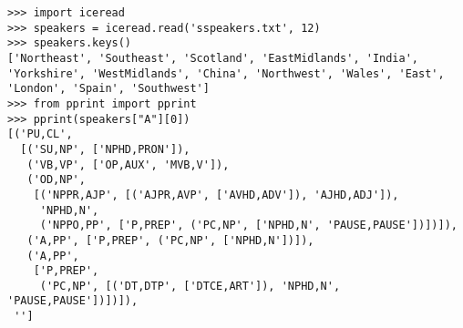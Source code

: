 \documentclass{beamer}
\begin{document}
\begin{frame}
\begin{verbatim}
>>> import iceread
>>> speakers = iceread.read('sspeakers.txt', 12)
>>> speakers.keys()
['Northeast', 'Southeast', 'Scotland', 'EastMidlands', 'India', 'Yorkshire', 'WestMidlands', 'China', 'Northwest', 'Wales', 'East', 'London', 'Spain', 'Southwest']
>>> from pprint import pprint
>>> pprint(speakers["A"][0])
[('PU,CL',
  [('SU,NP', ['NPHD,PRON']),
   ('VB,VP', ['OP,AUX', 'MVB,V']),
   ('OD,NP',
    [('NPPR,AJP', [('AJPR,AVP', ['AVHD,ADV']), 'AJHD,ADJ']),
     'NPHD,N',
     ('NPPO,PP', ['P,PREP', ('PC,NP', ['NPHD,N', 'PAUSE,PAUSE'])])]),
   ('A,PP', ['P,PREP', ('PC,NP', ['NPHD,N'])]),
   ('A,PP',
    ['P,PREP',
     ('PC,NP', [('DT,DTP', ['DTCE,ART']), 'NPHD,N', 'PAUSE,PAUSE'])])]),
 '']
\end{verbatim} %
\end{frame}
\end{document}
